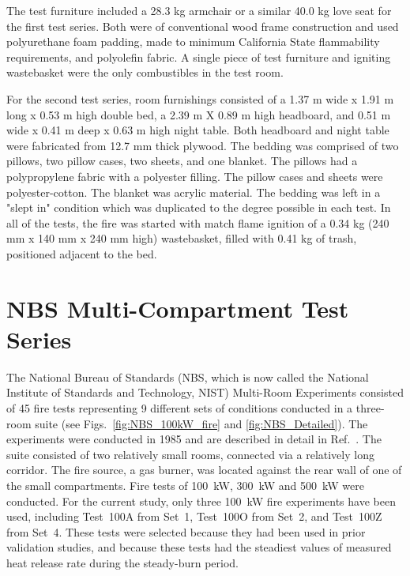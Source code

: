 The test furniture included a 28.3 kg armchair or a similar 40.0 kg love seat for the first test series. Both were of conventional wood frame construction and used polyurethane foam padding, made to minimum California State flammability requirements, and polyolefin fabric. A single piece of test furniture and igniting wastebasket were the only combustibles in the test room.

For the second test series, room furnishings consisted of a 1.37 m wide x 1.91 m long x 0.53 m high double bed, a 2.39 m X 0.89 m high headboard, and 0.51 m wide x 0.41 m deep x 0.63 m high night table. Both headboard and night table were fabricated from 12.7 mm thick plywood. The bedding was comprised of two pillows, two pillow cases, two sheets, and one blanket. The pillows had a polypropylene fabric with a polyester filling. The pillow cases and sheets were polyester-cotton. The blanket was acrylic material. The bedding was left in a "slept in" condition which was duplicated to the degree possible in each test. In all of the tests, the fire was started with match flame ignition of a 0.34 kg (240 mm x 140 mm x 240 mm high) wastebasket, filled with 0.41 kg of trash, positioned adjacent to the bed.

\FloatBarrier

\section{NBS Multi-Compartment Test Series}

The National Bureau of Standards (NBS, which is now called the National Institute of Standards and Technology, NIST) Multi-Room Experiments consisted of 45 fire tests representing 9 different sets of conditions conducted in a three-room suite (see Figs.~\ref{fig:NBS_100kW_fire} and \ref{fig:NBS_Detailed}). The experiments were conducted in 1985 and are described in detail in Ref.~\cite{Peacock:1988}. The suite consisted of two relatively small rooms, connected via a relatively long corridor. The fire source, a gas burner, was located against the rear wall of one of the small compartments.  Fire tests of 100~kW, 300~kW and 500~kW were conducted. For the current study, only three 100~kW fire experiments have been used, including Test~100A from Set~1, Test~100O from Set~2, and Test~100Z from Set~4. These tests were selected because they had been used in prior validation studies, and because these tests had the steadiest values of measured heat release rate during the steady-burn period.

